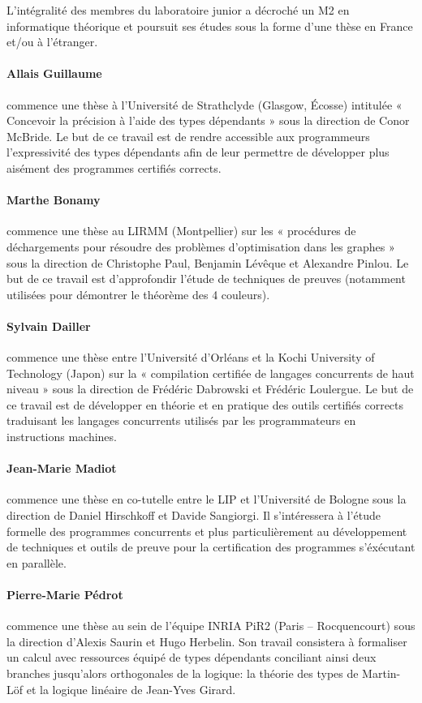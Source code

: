 
L'intégralité des membres du laboratoire junior a décroché un M2
en informatique théorique et poursuit ses études sous la forme
d'une thèse en France et/ou à l'étranger.

\paragraph{Allais Guillaume} commence une thèse à l'Université de
Strathclyde (Glasgow, Écosse) intitulée « Concevoir la précision
à l'aide des types dépendants » sous la direction de Conor McBride.
Le but de ce travail est de rendre accessible aux programmeurs
l'expressivité des types dépendants afin de leur permettre de
développer plus aisément des programmes certifiés corrects.

\paragraph{Marthe Bonamy} commence une thèse au LIRMM (Montpellier)
sur les « procédures de déchargements pour résoudre des problèmes
d'optimisation dans les graphes » sous la direction de Christophe
Paul, Benjamin Lévêque et Alexandre Pinlou.
Le but de ce travail est d'approfondir l'étude de techniques de
preuves (notamment utilisées pour démontrer le théorème des 4 couleurs).

\paragraph{Sylvain Dailler} commence une thèse entre
l'Université d'Orléans et la Kochi University of Technology (Japon)
sur la « compilation certifiée de langages concurrents de haut niveau »
sous la direction de Frédéric Dabrowski et Frédéric Loulergue.
Le but de ce travail est de développer en théorie et en pratique des
outils certifiés corrects traduisant les langages concurrents utilisés
par les programmateurs en instructions machines.

\paragraph{Jean-Marie Madiot} commence une thèse en co-tutelle entre
le LIP et l'Université de Bologne sous la direction de Daniel Hirschkoff
et Davide Sangiorgi. Il s'intéressera à l'étude formelle des programmes
concurrents et plus particulièrement au développement de techniques et
outils de preuve pour la certification des programmes s'éxécutant en
parallèle.

\paragraph{Pierre-Marie Pédrot} commence une thèse au sein de l'équipe
INRIA PiR2 (Paris -- Rocquencourt) sous la direction d'Alexis Saurin et Hugo
Herbelin. Son travail consistera à formaliser un  calcul avec ressources
équipé de types dépendants conciliant ainsi deux branches jusqu'alors
orthogonales de la logique: la théorie des types de Martin-Löf et la logique
linéaire de Jean-Yves Girard.

